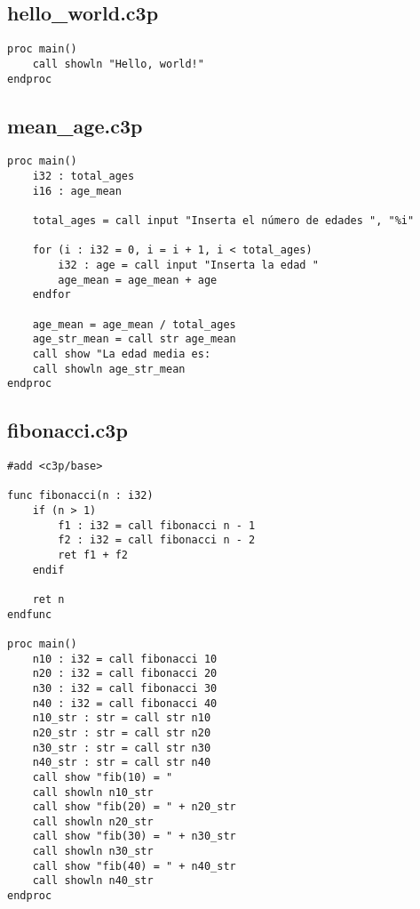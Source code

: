 \subsection{hello\_world.c3p}

\begin{verbatim}
proc main()
    call showln "Hello, world!"
endproc
\end{verbatim}

\subsection{mean\_age.c3p}
\begin{verbatim}
proc main()
    i32 : total_ages
    i16 : age_mean

    total_ages = call input "Inserta el número de edades ", "%i"

    for (i : i32 = 0, i = i + 1, i < total_ages)
        i32 : age = call input "Inserta la edad "
        age_mean = age_mean + age
    endfor

    age_mean = age_mean / total_ages
    age_str_mean = call str age_mean
    call show "La edad media es:
    call showln age_str_mean
endproc
\end{verbatim}

\subsection{fibonacci.c3p}

\begin{verbatim}
#add <c3p/base>

func fibonacci(n : i32)
    if (n > 1)
        f1 : i32 = call fibonacci n - 1
        f2 : i32 = call fibonacci n - 2
        ret f1 + f2
    endif

    ret n
endfunc

proc main()
    n10 : i32 = call fibonacci 10
    n20 : i32 = call fibonacci 20
    n30 : i32 = call fibonacci 30
    n40 : i32 = call fibonacci 40
    n10_str : str = call str n10
    n20_str : str = call str n20
    n30_str : str = call str n30
    n40_str : str = call str n40
    call show "fib(10) = "
    call showln n10_str
    call show "fib(20) = " + n20_str
    call showln n20_str
    call show "fib(30) = " + n30_str
    call showln n30_str
    call show "fib(40) = " + n40_str
    call showln n40_str
endproc
\end{verbatim}
